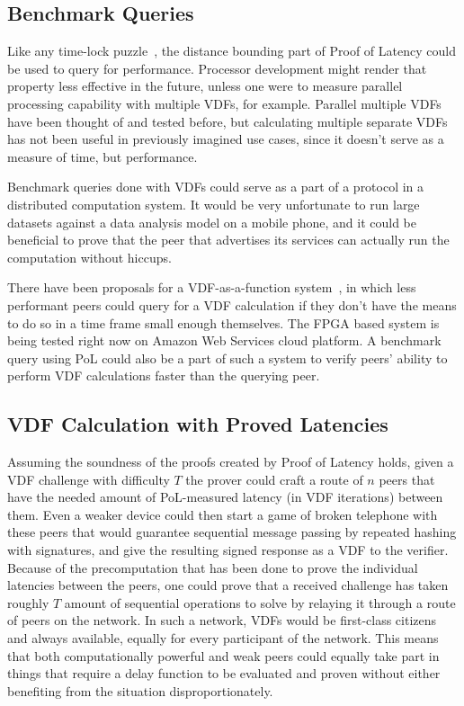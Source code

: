 \subsection{Benchmark Queries}
Like any time-lock puzzle~\cite{Mahmoody2013-zi}, the distance bounding part of Proof of Latency could be used to query for performance. Processor development might render that property less effective in the future, unless one were to measure parallel processing capability with multiple VDFs, for example. Parallel multiple VDFs have been thought of and tested before, but calculating multiple separate VDFs has not been useful in previously imagined use cases, since it doesn't serve as a measure of time, but performance.

Benchmark queries done with VDFs could serve as a part of a protocol in a distributed computation system. It would be very unfortunate to run large datasets against a data analysis model on a mobile phone, and it could be beneficial to prove that the peer that advertises its services can actually run the computation without hiccups.

There have been proposals for a VDF-as-a-function system~\cite{Devlin2020-qw}, in which less performant peers could query for a VDF calculation if they don't have the means to do so in a time frame small enough themselves. The FPGA based system is being tested right now on Amazon Web Services cloud platform. A benchmark query using PoL could also be a part of such a system to verify peers' ability to perform VDF calculations faster than the querying peer.

\subsection{VDF Calculation with Proved Latencies}
Assuming the soundness of the proofs created by Proof of Latency holds, given a VDF challenge with difficulty \(T\) the prover could craft a route of \(n\) peers that have the needed amount of PoL-measured latency (in VDF iterations) between them. Even a weaker device could then start a game of broken telephone with these peers that would guarantee sequential message passing by repeated hashing with signatures, and give the resulting signed response as a VDF to the verifier. Because of the precomputation that has been done to prove the individual latencies between the peers, one could prove that a received challenge has taken roughly \(T\) amount of sequential operations to solve by relaying it through a route of peers on the network. In such a network, VDFs would be first-class citizens and always available, equally for every participant of the network. This means that both computationally powerful and weak peers could equally take part in things that require a delay function to be evaluated and proven without either benefiting from the situation disproportionately.

